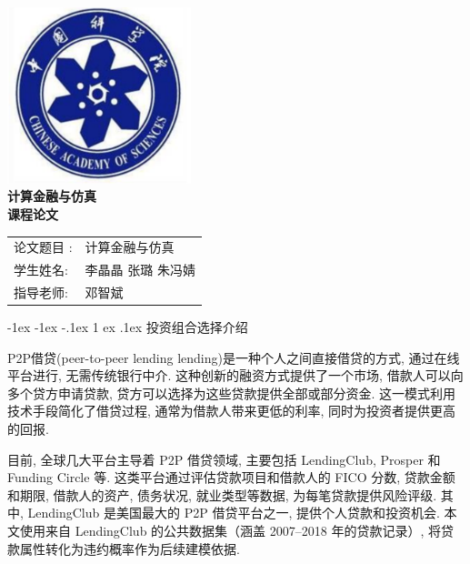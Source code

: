 \documentclass{write_paper}
\makeatletter
\renewcommand\section{\@startsection {section}{1}{\z@}%
                                   {-1ex \@plus -1ex \@minus -.1ex}%
                                   {1 ex \@plus.1ex}%
                                   {\normalfont\large\bfseries}}
\makeatother
\begin{document}
\vspace*{\fill}

\begin{center}

    \includegraphics[width=0.4\textwidth]{Figures/校徽.png}\\[1cm]
       \Huge \bfseries
      {计算金融与仿真}\\[0.5cm]
       \Huge \bfseries
      {课程论文}\\[2cm]
    
    \Large
    \begin{table}[htbp]
    \centering
    \Large
    \begin{tabular}{ll}
   {论文题目 }: & 计算金融与仿真 \\
   {学生姓名}: & 李晶晶 \quad 张璐 \quad 朱冯婧 \\
   {指导老师}: & 邓智斌 
    \end{tabular}
    \end{table}

    


\end{center}

\vspace*{\fill}
\newpage





\section{投资组合选择介绍}


P2P借贷(peer-to-peer lending lending)是一种个人之间直接借贷的方式, 通过在线平台进行, 无需传统银行中介. 这种创新的融资方式提供了一个市场, 借款人可以向多个贷方申请贷款, 贷方可以选择为这些贷款提供全部或部分资金. 这一模式利用技术手段简化了借贷过程, 通常为借款人带来更低的利率, 同时为投资者提供更高的回报. 

目前, 全球几大平台主导着 P2P 借贷领域, 主要包括 LendingClub, Prosper 和 Funding Circle 等. 这类平台通过评估贷款项目和借款人的 FICO 分数, 贷款金额和期限, 借款人的资产, 债务状况, 就业类型等数据, 为每笔贷款提供风险评级. 其中, LendingClub 是美国最大的 P2P 借贷平台之一, 提供个人贷款和投资机会. 本文使用来自 LendingClub 的公共数据集（涵盖 2007--2018 年的贷款记录）, 将贷款属性转化为违约概率作为后续建模依据. 
\end{document}
